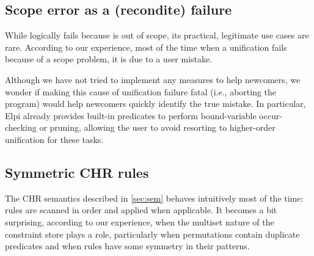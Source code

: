 \documentclass[a4paper, 11pt]{book}
\begin{document}
\subsection{Scope error as a (recondite) failure}

While  logically fails because  is out of scope, its
practical, legitimate use cases are rare. According to our experience, most
of the time when a unification fails because of a scope problem, it is due to
a user mistake.

Although we have not tried to implement any measures to help newcomers, we
wonder if making this cause of unification failure fatal (i.e., aborting the
program) would help newcomers quickly identify the true mistake. In
particular, Elpi already provides built-in predicates to perform
bound-variable occur-checking or pruning, allowing the user to avoid resorting
to higher-order unification for these tasks.

\subsection{Symmetric CHR rules}

The CHR semantics described in \cref{sec:sem} behaves intuitively most of the
time: rules are scanned in order and applied when applicable. It becomes a bit
surprising, according to our experience, when the multiset nature of the
constraint store plays a role, particularly when permutations contain
duplicate predicates and when rules have some symmetry in their patterns.
\end{document}
